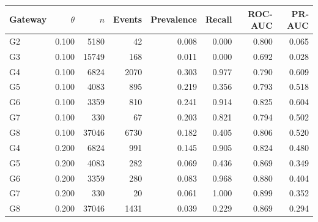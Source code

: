 \begin{tabular}{lrrrrrrr}
\toprule
Gateway & $\theta$ & $n$ & Events & Prevalence & Recall & ROC-AUC & PR-AUC \\
\midrule
G2 & 0.100 & 5180 & 42 & 0.008 & 0.000 & 0.800 & 0.065 \\
G3 & 0.100 & 15749 & 168 & 0.011 & 0.000 & 0.692 & 0.028 \\
G4 & 0.100 & 6824 & 2070 & 0.303 & 0.977 & 0.790 & 0.609 \\
G5 & 0.100 & 4083 & 895 & 0.219 & 0.356 & 0.793 & 0.518 \\
G6 & 0.100 & 3359 & 810 & 0.241 & 0.914 & 0.825 & 0.604 \\
G7 & 0.100 & 330 & 67 & 0.203 & 0.821 & 0.794 & 0.502 \\
G8 & 0.100 & 37046 & 6730 & 0.182 & 0.405 & 0.806 & 0.520 \\
G4 & 0.200 & 6824 & 991 & 0.145 & 0.905 & 0.824 & 0.480 \\
G5 & 0.200 & 4083 & 282 & 0.069 & 0.436 & 0.869 & 0.349 \\
G6 & 0.200 & 3359 & 280 & 0.083 & 0.968 & 0.880 & 0.404 \\
G7 & 0.200 & 330 & 20 & 0.061 & 1.000 & 0.899 & 0.352 \\
G8 & 0.200 & 37046 & 1431 & 0.039 & 0.229 & 0.869 & 0.294 \\
\bottomrule
\end{tabular}
